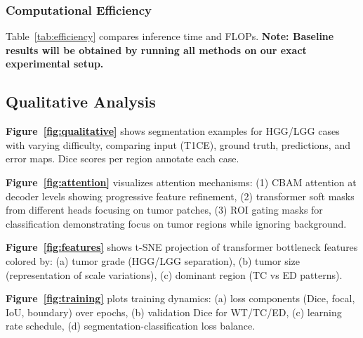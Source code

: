 \documentclass[runningheads]{llncs}
\begin{document}
\subsubsection{Computational Efficiency}

Table~\ref{tab:efficiency} compares inference time and FLOPs. \textbf{Note: Baseline results will be obtained by running all methods on our exact experimental setup.}


\subsection{Qualitative Analysis}

\textbf{Figure~\ref{fig:qualitative}} shows segmentation examples for HGG/LGG cases with varying difficulty, comparing input (T1CE), ground truth, predictions, and error maps. Dice scores per region annotate each case.

\textbf{Figure~\ref{fig:attention}} visualizes attention mechanisms: (1) CBAM attention at decoder levels showing progressive feature refinement, (2) transformer soft masks from different heads focusing on tumor patches, (3) ROI gating masks for classification demonstrating focus on tumor regions while ignoring background.

\textbf{Figure~\ref{fig:features}} shows t-SNE projection of transformer bottleneck features colored by: (a) tumor grade (HGG/LGG separation), (b) tumor size (representation of scale variations), (c) dominant region (TC vs ED patterns).

\textbf{Figure~\ref{fig:training}} plots training dynamics: (a) loss components (Dice, focal, IoU, boundary) over epochs, (b) validation Dice for WT/TC/ED, (c) learning rate schedule, (d) segmentation-classification loss balance.
\end{document}
